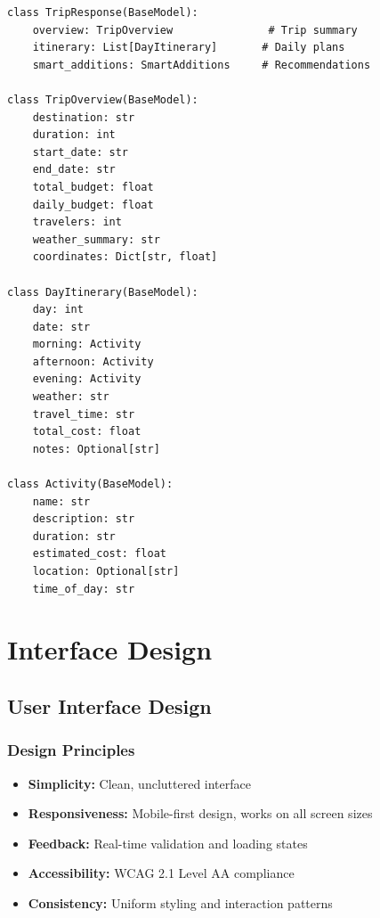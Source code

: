 \documentclass[12pt,a4paper]{report}
\begin{document}
\begin{lstlisting}[style=pythonstyle, caption={TripResponse Pydantic Model}]
class TripResponse(BaseModel):
    overview: TripOverview               # Trip summary
    itinerary: List[DayItinerary]       # Daily plans
    smart_additions: SmartAdditions     # Recommendations

class TripOverview(BaseModel):
    destination: str
    duration: int
    start_date: str
    end_date: str
    total_budget: float
    daily_budget: float
    travelers: int
    weather_summary: str
    coordinates: Dict[str, float]

class DayItinerary(BaseModel):
    day: int
    date: str
    morning: Activity
    afternoon: Activity
    evening: Activity
    weather: str
    travel_time: str
    total_cost: float
    notes: Optional[str]

class Activity(BaseModel):
    name: str
    description: str
    duration: str
    estimated_cost: float
    location: Optional[str]
    time_of_day: str
\end{lstlisting}


\chapter{Interface Design}

\section{User Interface Design}

\subsection{Design Principles}

\begin{itemize}[leftmargin=*]
    \item \textbf{Simplicity:} Clean, uncluttered interface
    \item \textbf{Responsiveness:} Mobile-first design, works on all screen sizes
    \item \textbf{Feedback:} Real-time validation and loading states
    \item \textbf{Accessibility:} WCAG 2.1 Level AA compliance
    \item \textbf{Consistency:} Uniform styling and interaction patterns
\end{itemize}
\end{document}
